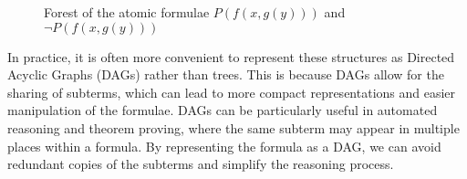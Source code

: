 \begin{figure}[H]
    \centering
    \begin{minipage}[t]{0.48\textwidth}
        \centering
    \end{minipage}
    \hfill
    \begin{minipage}[t]{0.48\textwidth}
        \centering
    \end{minipage}
    \caption{Forest of the atomic formulae \(P(f(x, g(y)))\) and \(\neg P(f(x, g(y)))\)}\label{fig:subterm_forest}
\end{figure}


In practice, it is often more convenient to represent these structures as Directed Acyclic Graphs (DAGs) rather than trees. This is because DAGs allow for the sharing of subterms, which can lead to more compact representations and easier manipulation of the formulae.
DAGs can be particularly useful in automated reasoning and theorem proving, where the same subterm may appear in multiple places within a formula. By representing the formula as a DAG, we can avoid redundant copies of the subterms and simplify the reasoning process.

